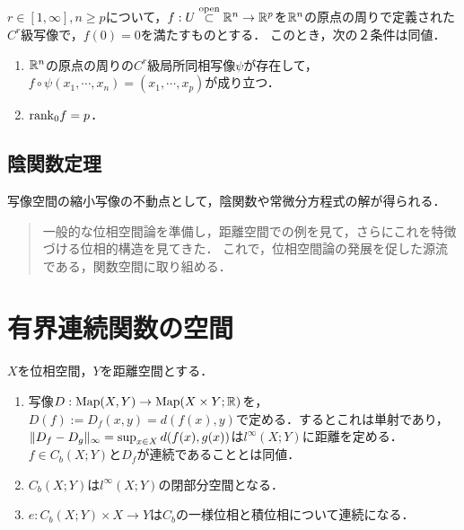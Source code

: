 \documentclass[uplatex,dvipdfmx]{jsreport}
\begin{document}
\begin{corollary}[低次元への写像の場合]\label{cor-implicit-function-2}
    $r\in[1,\infty],n\ge p$について，$f:U\overset{\mathrm{open}}{\subset}\mathbb{R}^n\to\mathbb{R}^p$を$\mathbb{R}^n$の原点の周りで定義された$C^r$級写像で，$f(0)=0$を満たすものとする．
    このとき，次の２条件は同値．
    \begin{enumerate}
        \item $\mathbb{R}^n$の原点の周りの$C^r$級局所同相写像$\psi$が存在して，$f\circ\psi(x_1,\cdots,x_n)=(x_1,\cdots,x_p)$が成り立つ．
        \item $\mathrm{rank}_0f=p$．
    \end{enumerate}
\end{corollary}


\subsection{陰関数定理}

\begin{tcolorbox}[colframe=ForestGreen, colback=ForestGreen!10!white,breakable,colbacktitle=ForestGreen!40!white,coltitle=black,fonttitle=\bfseries\sffamily,
title=]
    写像空間の縮小写像の不動点として，陰関数や常微分方程式の解が得られる．
\end{tcolorbox}

\begin{quotation}
    一般的な位相空間論を準備し，距離空間での例を見て，さらにこれを特徴づける位相的構造を見てきた．
    これで，位相空間論の発展を促した源流である，関数空間に取り組める．
\end{quotation}

\section{有界連続関数の空間}

\begin{proposition}
    $X$を位相空間，$Y$を距離空間とする．
    \begin{enumerate}
        \item 写像$D:\mathrm{Map}(X,Y)\to\mathrm{Map}(X\times Y;\mathbb{R})$を，$D(f):=D_f(x,y)=d(f(x),y)$で定める．するとこれは単射であり，$\|D_f-D_g\|_\infty=\sup_{x\in X}d(f(x),g(x))$は$l^\infty(X;Y)$に距離を定める．$f\in C_b(X;Y)$と$D_f$が連続であることとは同値．
        \item $C_b(X;Y)$は$l^\infty(X;Y)$の閉部分空間となる．
        \item $e:C_b(X;Y)\times X\to Y$は$C_b$の一様位相と積位相について連続になる．
    \end{enumerate}
\end{proposition}
\end{document}
